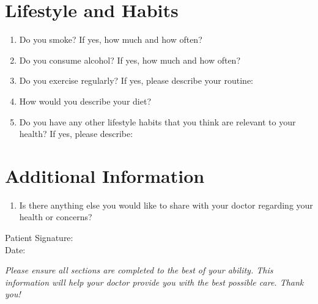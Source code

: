 \documentclass{article}
\begin{document}
\section*{Lifestyle and Habits}

\begin{enumerate}[leftmargin=*, labelsep=1cm, align=left]
    \item Do you smoke? If yes, how much and how often? \underline{\hspace{10cm}}
    \item Do you consume alcohol? If yes, how much and how often? \underline{\hspace{10cm}}
    \item Do you exercise regularly? If yes, please describe your routine: \\
    \underline{\hspace{25cm}}
    \item How would you describe your diet? \underline{\hspace{10cm}}
    \item Do you have any other lifestyle habits that you think are relevant to your health? If yes, please describe: \\
    \underline{\hspace{25cm}}
\end{enumerate}

\section*{Additional Information}

\begin{enumerate}[leftmargin=*, labelsep=1cm, align=left]
    \item Is there anything else you would like to share with your doctor regarding your health or concerns? \\
    \underline{\hspace{25cm}}
\end{enumerate}

\vspace{1cm}
\begin{tabbing}
Patient Signature: \hspace{5cm} \= \underline{\hspace{10cm}} \\
Date: \> \underline{\hspace{10cm}}
\end{tabbing}

\vspace{1cm}
\noindent\textit{Please ensure all sections are completed to the best of your ability. This information will help your doctor provide you with the best possible care. Thank you!}
\end{document}
